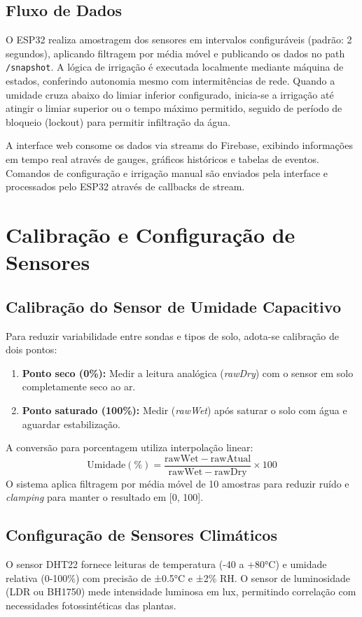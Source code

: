 \documentclass[twoside,english,brazilian]{UNISINOSmonografia}
\begin{document}
\subsection{Fluxo de Dados}
O ESP32 realiza amostragem dos sensores em intervalos configuráveis (padrão: 2 segundos), aplicando filtragem por média móvel e publicando os dados no path \texttt{/snapshot}. A lógica de irrigação é executada localmente mediante máquina de estados, conferindo autonomia mesmo com intermitências de rede. Quando a umidade cruza abaixo do limiar inferior configurado, inicia-se a irrigação até atingir o limiar superior ou o tempo máximo permitido, seguido de período de bloqueio (lockout) para permitir infiltração da água.

A interface web consome os dados via streams do Firebase, exibindo informações em tempo real através de gauges, gráficos históricos e tabelas de eventos. Comandos de configuração e irrigação manual são enviados pela interface e processados pelo ESP32 através de callbacks de stream.

\section{Calibração e Configuração de Sensores}

\subsection{Calibração do Sensor de Umidade Capacitivo}
Para reduzir variabilidade entre sondas e tipos de solo, adota-se calibração de dois pontos:
\begin{enumerate}
    \item \textbf{Ponto seco (0\%):} Medir a leitura analógica (\emph{rawDry}) com o sensor em solo completamente seco ao ar.
    \item \textbf{Ponto saturado (100\%):} Medir (\emph{rawWet}) após saturar o solo com água e aguardar estabilização.
\end{enumerate}
A conversão para porcentagem utiliza interpolação linear:
\[
\mathrm{Umidade}(\%) = \frac{\mathrm{rawWet} - \mathrm{rawAtual}}{\mathrm{rawWet} - \mathrm{rawDry}} \times 100
\]
O sistema aplica filtragem por média móvel de 10 amostras para reduzir ruído e \emph{clamping} para manter o resultado em [0, 100].

\subsection{Configuração de Sensores Climáticos}
O sensor DHT22 fornece leituras de temperatura (-40 a +80°C) e umidade relativa (0-100\%) com precisão de ±0.5°C e ±2\% RH. O sensor de luminosidade (LDR ou BH1750) mede intensidade luminosa em lux, permitindo correlação com necessidades fotossintéticas das plantas.
\end{document}
